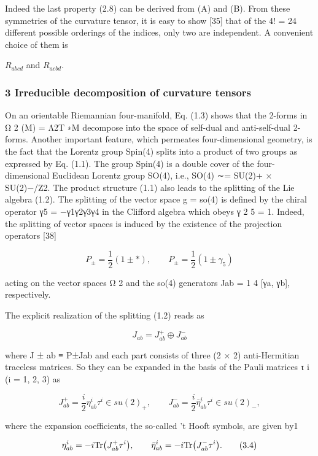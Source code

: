 \documentclass{article}
\begin{document}
Indeed the last property (2.8) can be derived from (A) and (B). From these symmetries of the curvature tensor, it is easy to show [35] that of the 4! = 24 different possible orderings of the indices, only two are independent. A convenient choice of them is

$R_{abcd}$ and $R_{acbd}$.

\subsubsection{3 Irreducible decomposition of curvature tensors}

On an orientable Riemannian four-manifold, Eq. (1.3) shows that the 2-forms in Ω 2 (M) = Λ2T ∗M decompose into the space of self-dual and anti-self-dual 2-forms. Another important feature, which permeates four-dimensional geometry, is the fact that the Lorentz group Spin(4) splits into a product of two groups as expressed by Eq. (1.1). The group Spin(4) is a double cover of the four-dimensional Euclidean Lorentz group SO(4), i.e., SO(4) ∼= SU(2)+ × SU(2)−/Z2. The product structure (1.1) also leads to the splitting of the Lie algebra (1.2). The splitting of the vector space g = so(4) is defined by the chiral operator γ5 = −γ1γ2γ3γ4 in the Clifford algebra which obeys γ 2 5 = 1. Indeed, the splitting of vector spaces is induced by the existence of the projection operators [38]

$$P_{\pm}=\frac{1}{2}(1\pm*),\qquad P_{\pm}=\frac{1}{2}(1\pm\gamma_{5})\tag{3.1}$$

acting on the vector spaces Ω 2 and the so(4) generators Jab = 1 4 [γa, γb], respectively.

The explicit realization of the splitting (1.2) reads as

$$J_{ab}=J_{ab}^{+}\oplus J_{ab}^{-}\tag{3.2}$$

where J ± ab ≡ P±Jab and each part consists of three (2 × 2) anti-Hermitian traceless matrices. So they can be expanded in the basis of the Pauli matrices τ i (i = 1, 2, 3) as

$$J^{+}_{ab}=\frac{i}{2}\eta^{i}_{ab}\tau^{i}\in su(2)_{+},\qquad J^{-}_{ab}=\frac{i}{2}\bar{\eta}^{i}_{ab}\tau^{i}\in su(2)_{-},\tag{3.3}$$

where the expansion coefficients, the so-called 't Hooft symbols, are given by1

$$\eta^{i}_{ab}=-i{\rm Tr}\big{(}J^{+}_{ab}\tau^{i}\big{)},\qquad\bar{\eta}^{i}_{ab}=-i{\rm Tr}\big{(}J^{-}_{ab}\tau^{i}\big{)}.\tag{3.4}$$
\end{document}
